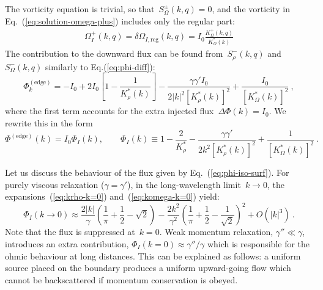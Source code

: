 \documentclass[preprint,aps,eqsecnum, prb]{revtex4-1}
\newcommand{\fplus}[1]{{#1}^{+}}
\newcommand{\fminus}[1]{{#1}^{-}}
\newcommand{\fplusminus}[1]{{#1}^{\pm}}
\begin{document}
The vorticity equation is trivial, so that~$\fplusminus{S}_\Omega(k, q) = 0$,
and the vorticity in Eq.~(\ref{eq:solution-omega-plus}) includes
only the regular part:
\begin{align}
  \label{eq:iso-omega}
  \fplus{\Omega}_{I}(k, q)
  = \delta\Omega_{I, \mathrm{reg}}(k, q)
  = I_0 \frac{\fplus{K}_\Omega(k, q)}{K_\Omega^\ast(k)}
\end{align}
The contribution to the downward flux can be found from~$\fminus{S}_\rho(k, q)$
and~$\fminus{S}_\Omega(k, q)$ similarly to Eq.(\ref{eq:phi-diff}):
\begin{equation}
  \label{eq:iso-flux-dPhi}
  \Phi^\mathrm{(edge)}_{k} =  -I_0
  + 2 I_0 \left[1 - \frac{1}{K_\rho^\ast(k)}\right]
  - \frac{\gamma \gamma' I_0}{2|k|^2 \left[K_\rho^\ast(k)\right]^2}
  + \frac{I_0}{\left[K_\Omega^\ast(k)\right]^2}
\ ,
\end{equation}
where the first term accounts for
the extra injected flux~$\Delta\Phi(k) = I_0$.
We rewrite this in the form
\begin{equation}
  \label{eq:phi-iso-surf}
  \Phi^\mathrm{(edge)}(k) =
  I_0 \Phi_I(k), \qquad
  \Phi_I(k) \equiv 1  - \frac{2}{K_\rho^\ast}
    - \frac{\gamma \gamma'}{2k^2 \left[K_\rho^\ast(k)\right]^2}
    + \frac{1}{\left[K_\Omega^\ast(k)\right]^2} \ .
\end{equation}
%

Let us discuss the behaviour of the flux given by Eq.~(\ref{eq:phi-iso-surf}).
For purely viscous relaxation ($\gamma = \gamma'$),
in the long-wavelength limit~$k \to 0$,
the expansions~(\ref{eq:krho-k=0}) and~(\ref{eq:komega-k=0}) yield:
\begin{equation}
  \label{eq:phi-I-low}
  \Phi_I(k\to 0) \approx \frac{2|k|}{\gamma} \left(\frac{1}{\pi} + \frac{1}{2}
    - \sqrt{2}\right)
  - \frac{2k^2}{\gamma^2}
    \left(\frac{1}{\pi} + \frac{1}{2} - \frac{1}{\sqrt{2}}\right)^2
    + O(|k|^3)
\ .
\end{equation}
Note that the flux is suppressed at~$k = 0$.
Weak momentum relaxation, $\gamma'' \ll \gamma$,
introduces an extra contribution,
$\Phi_I(k = 0) \approx \gamma'' / \gamma$ which is responsible for
the ohmic behaviour at long distances. This can be explained as follows:
a uniform source placed on the boundary produces a uniform upward-going
flow which cannot be backscattered if momentum conservation is obeyed.
\end{document}
